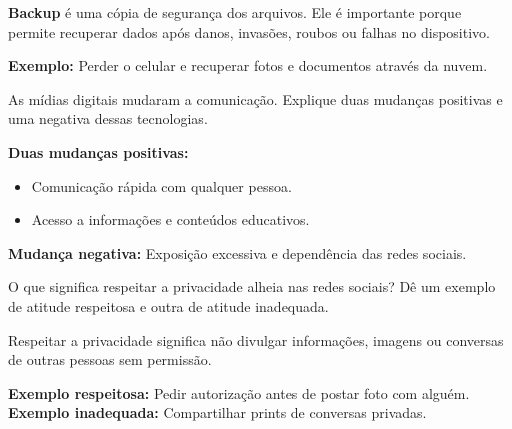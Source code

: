 \documentclass[11pt]{article}
\begin{document}
\begin{tcolorbox}[colback=green!10,colframe=green!60!black,
title=\textbf{Solução 7 — Explicação }]
\textbf{Backup} é uma cópia de segurança dos arquivos.  
Ele é importante porque permite recuperar dados após danos, invasões,
roubos ou falhas no dispositivo.

\textbf{Exemplo:} Perder o celular e recuperar fotos e documentos através da nuvem.
\end{tcolorbox}


\begin{tcolorbox}[colback=blue!10,colframe=blue!60!black,
title=\textbf{Questão 8 – Mídias Digitais}]
As mídias digitais mudaram a comunicação.  
Explique duas mudanças positivas e uma negativa dessas tecnologias.
\end{tcolorbox}

\begin{tcolorbox}[colback=green!10,colframe=green!60!black,
title=\textbf{Solução 8 — Explicação }]
\textbf{Duas mudanças positivas:}
\begin{itemize}
\item Comunicação rápida com qualquer pessoa.
\item Acesso a informações e conteúdos educativos.
\end{itemize}

\textbf{Mudança negativa:}  
Exposição excessiva e dependência das redes sociais.
\end{tcolorbox}


\begin{tcolorbox}[colback=blue!10,colframe=blue!60!black,
title=\textbf{Questão 9 – Respeito à Privacidade}]
O que significa respeitar a privacidade alheia nas redes sociais?  
Dê um exemplo de atitude respeitosa e outra de atitude inadequada.
\end{tcolorbox}

\begin{tcolorbox}[colback=green!10,colframe=green!60!black,
title=\textbf{Solução 9 — Explicação }]
Respeitar a privacidade significa não divulgar informações, imagens ou conversas
de outras pessoas sem permissão.

\textbf{Exemplo respeitosa:} Pedir autorização antes de postar foto com alguém.  
\textbf{Exemplo inadequada:} Compartilhar prints de conversas privadas.
\end{tcolorbox}
\end{document}
